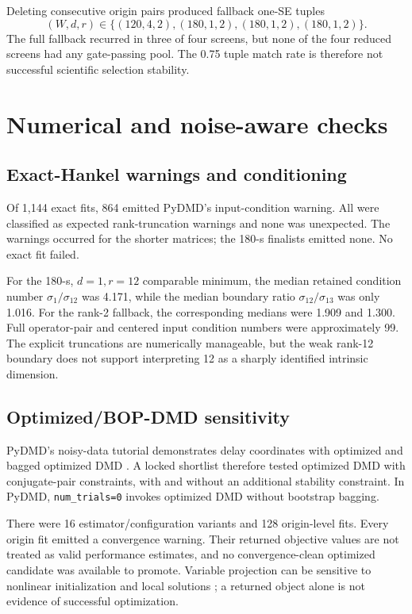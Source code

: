 \documentclass[11pt]{article}
\begin{document}
Deleting consecutive origin pairs produced fallback one-SE tuples
\[
(W,d,r)\in
\{(120,4,2),(180,1,2),(180,1,2),(180,1,2)\}.
\]
The full fallback recurred in three of four screens, but none of the four
reduced screens had any gate-passing pool.  The 0.75 tuple match rate is
therefore not successful scientific selection stability.

\section{Numerical and noise-aware checks}

\subsection{Exact-Hankel warnings and conditioning}

Of 1,144 exact fits, 864 emitted PyDMD's input-condition warning.  All were
classified as expected rank-truncation warnings and none was unexpected.
The warnings occurred for the shorter matrices; the 180-s finalists emitted
none.  No exact fit failed.

For the 180-s, \(d=1,r=12\) comparable minimum, the median retained condition
number \(\sigma_1/\sigma_{12}\) was 4.171, while the median boundary ratio
\(\sigma_{12}/\sigma_{13}\) was only 1.016.  For the rank-2 fallback, the
corresponding medians were 1.909 and 1.300.  Full operator-pair and centered
input condition numbers were approximately 99.  The explicit truncations are
numerically manageable, but the weak rank-12 boundary does not support
interpreting 12 as a sharply identified intrinsic dimension.

\subsection{Optimized/BOP-DMD sensitivity}

PyDMD's noisy-data tutorial demonstrates delay coordinates with optimized and
bagged optimized DMD \cite{pydmdtutorial,bopdmd}.  A locked shortlist therefore
tested optimized DMD with conjugate-pair constraints, with and without an
additional stability constraint.  In PyDMD, \texttt{num\_trials=0} invokes
optimized DMD without bootstrap bagging.

There were 16 estimator/configuration variants and 128 origin-level fits.
Every origin fit emitted a convergence warning.  Their returned objective
values are not treated as valid performance estimates, and no
convergence-clean optimized candidate was available to promote.  Variable
projection can be sensitive to nonlinear initialization and local solutions
\cite{askham}; a returned object alone is not evidence of successful
optimization.
\end{document}
